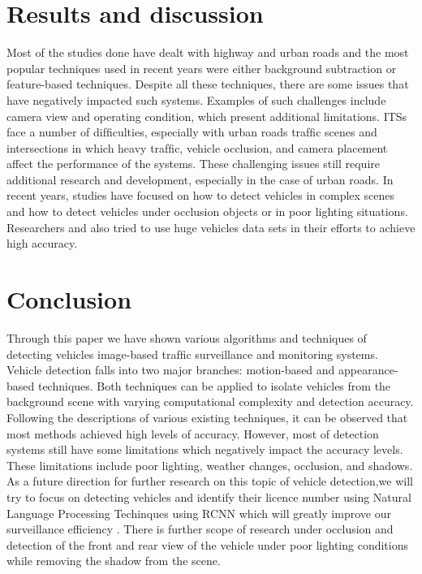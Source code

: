 \documentclass[12pt,a4paper,roman]{article}
\begin{document}
\newpage
\section{Results and discussion}
{Most of the studies done have dealt with highway and urban roads and the most popular techniques used in recent years were either background subtraction or feature-based techniques. Despite all these techniques, there are some issues that have negatively impacted such systems. Examples of such challenges include camera view and operating condition, which present additional limitations. ITSs face a number of difﬁculties, especially with urban roads trafﬁc scenes and intersections in which heavy trafﬁc, vehicle occlusion, and camera placement affect the performance of the systems. These challenging issues still require additional research and development, especially in the case of urban roads. In recent years, studies have focused on how to detect vehicles in complex scenes and how to detect vehicles under occlusion objects or in poor lighting situations. Researchers and also tried to use huge vehicles data sets in their efforts to achieve high accuracy.}

\section{Conclusion}
{ Through this paper we have shown various algorithms and techniques of detecting vehicles image-based trafﬁc surveillance and monitoring systems. Vehicle detection falls into two major branches: motion-based and appearance-based techniques. Both techniques can be applied to isolate vehicles from the background scene with varying computational complexity and detection accuracy. Following the descriptions of various existing techniques, it can be observed that most methods achieved high levels of accuracy. However, most of detection systems still have some limitations which negatively impact the accuracy levels. These limitations include poor lighting, weather changes, occlusion, and shadows.
\\

As a future direction for further research on this topic of vehicle detection,we will try to focus on detecting vehicles  and identify their licence number using Natural Language Processing Techinques using RCNN which will greatly improve our surveillance efficiency .
There is further scope of research under occlusion and detection of the front and rear view of the vehicle under poor lighting conditions while removing the shadow from the scene.}
\\
\end{document}
